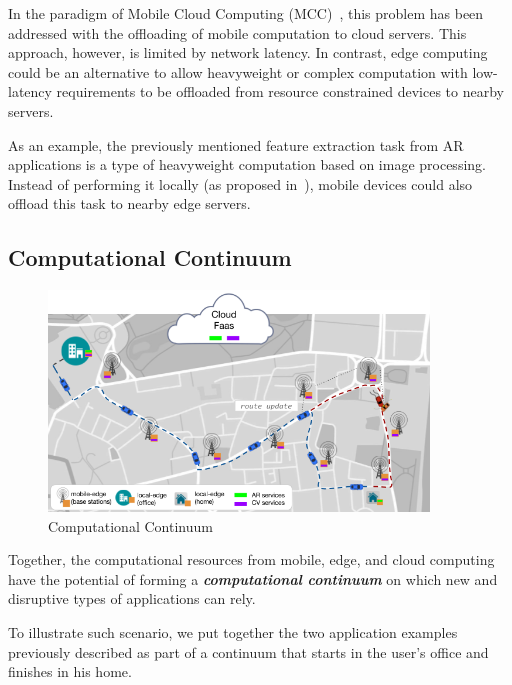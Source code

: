 In the paradigm of Mobile Cloud Computing (MCC)~\cite{Khan:14}, this problem has been addressed with the offloading of mobile computation to cloud servers. This approach, however, is limited by network latency. In contrast, edge computing could be an alternative to allow heavyweight or complex computation with low-latency requirements to be offloaded from resource constrained devices to nearby servers.


As an example, the previously mentioned feature extraction task from AR applications is a type of heavyweight computation based on image processing. Instead of performing it locally (as proposed in~\cite{Huang2012}), mobile devices could also offload this task to nearby edge servers. 

\subsection{Computational Continuum}

\begin{figure}[tbp]
	\includegraphics[width=0.9\textwidth]{figs/continuum.png}
	\caption{Computational Continuum}
	\label{fig:developer-control-serverless}
\end{figure}

Together, the computational resources from mobile, edge, and cloud computing have the potential of forming a \textit{\textbf{computational continuum}} on which new and disruptive types of applications can rely. 

To illustrate such scenario, we put together the two application examples previously described as part of a continuum that starts in the user's office and finishes in his home. 

